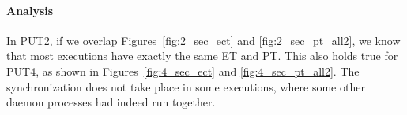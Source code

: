 \documentclass[10pt]{article}
\begin{document}
\paragraph{Analysis} In PUT2, if we overlap Figures~\ref{fig:2_sec_ect} and \ref{fig:2_sec_pt_all2}, 
we know that most executions have exactly the same ET and PT. 
This also holds true for PUT4, as shown in Figures~\ref{fig:4_sec_ect} and \ref{fig:4_sec_pt_all2}. 
The synchronization does not take place in some executions, where some other daemon processes had indeed run together.

%
%
%
\end{document}
